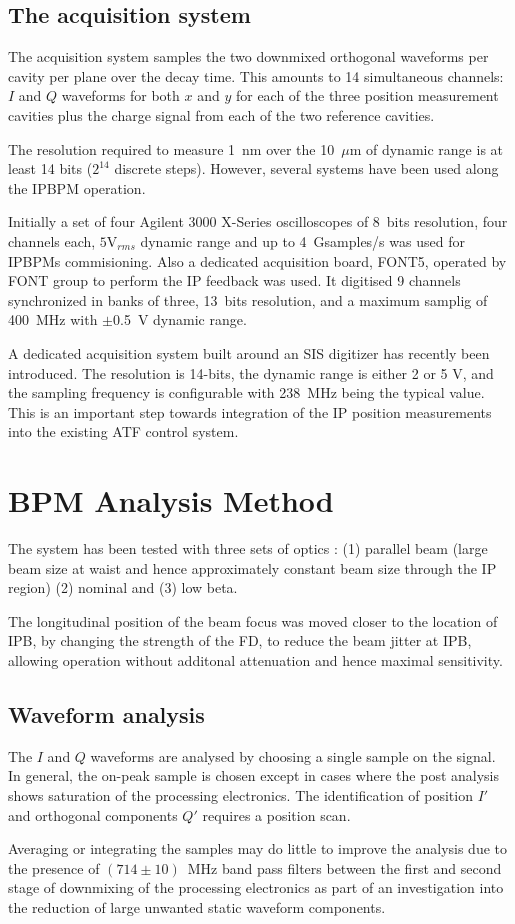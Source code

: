 \subsection{The acquisition system}\label{s:acqsys}
The acquisition system samples the two downmixed orthogonal waveforms per cavity per plane over the decay time. This amounts to 14 simultaneous channels: $I$ and $Q$ waveforms for both $x$ and $y$ for each of the three position measurement cavities plus the charge signal from each of the two reference cavities.\par
The resolution required to measure 1~nm over the 10~$\mu$m of dynamic range is at least 14 bits ($2^{14}$ discrete steps). However, several systems have been used along the IPBPM operation.\par
Initially a set of four Agilent 3000 X-Series oscilloscopes of 8~bits resolution, four channels each, $5$V$_{rms}$ dynamic range and up to 4~Gsamples/s was used for IPBPMs commisioning. Also a dedicated acquisition board, FONT5, operated by FONT group to perform the IP feedback was used. It digitised 9 channels synchronized in banks of three, 13~bits resolution, and a maximum samplig of 400~MHz with $\pm$0.5~V dynamic range.\par
A dedicated acquisition system built around an SIS digitizer has recently been introduced. The resolution is 14-bits, the dynamic range is either 2 or 5 V, and the sampling frequency is configurable with 238~MHz being the typical value. This is an important step towards integration of the IP position measurements into the existing ATF control system.\par

\section{BPM Analysis Method}
The system has been tested with three sets of optics : (1) parallel beam (large beam size at waist and hence approximately constant beam size through the IP region) (2) nominal and (3) low beta.\par
The longitudinal position of the beam focus was moved closer to the location of IPB, by changing the strength of the FD, to reduce the beam jitter at IPB, allowing operation without additonal attenuation and hence maximal sensitivity.\par
\subsection{Waveform analysis}
The $I$ and $Q$ waveforms are analysed by choosing a single sample on the signal. In general, the on-peak sample is chosen except in cases where the post analysis shows saturation of the processing electronics. The identification of position $I'$ and orthogonal components $Q'$ requires a position scan.\par
Averaging or integrating the samples may do little to improve the analysis due to the presence of $(714\pm10)$~MHz band pass filters between the first and second stage of downmixing of the processing electronics as part of an investigation into the reduction of large unwanted static waveform components.\par
